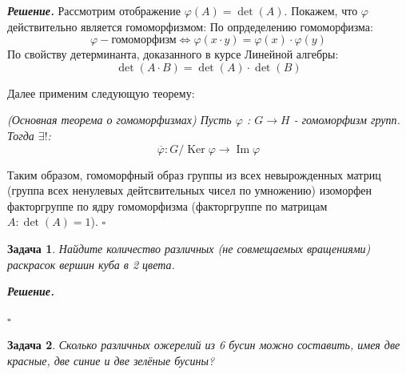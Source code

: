 \documentclass[12pt]{article}
\newtheorem{problem}{Задача}
\newenvironment{solution}[1][\it{Решение}]{\textbf{#1. } }{$\square$}
\DeclareMathOperator{\Ima}{Im}
\DeclareMathOperator{\Kera}{Ker}
\begin{document}
\begin{solution}
    Рассмотрим отображение $\varphi (A) = \det (A)$. Покажем,
    что $\varphi$ действительно является гомоморфизмом:
    По опрдеделению гомоморфизма: 
    $$ 
    \varphi - \text{гомоморфизм} \Leftrightarrow \displaystyle \varphi(x\cdot y)=\varphi(x) \cdot \varphi(y)
    $$
    По свойству детерминанта, доказанного в курсе Линейной алгебры:
    $$
    \det(A \cdot B) = \det (A) \cdot \det(B)
    $$

    Далее применим следующую теорему:
    
    \textit{(Основная теорема о гомоморфизмах) Пусть $\varphi$ : $G \rightarrow H$ - гомоморфизм групп. Тогда $\exists!$:}
    $$
    \overline{\varphi} : G / \Kera \varphi \rightarrow \Ima \varphi
    $$


    Таким образом, гомоморфный образ группы из всех невырожденных матриц (группа всех ненулевых дейтсвительных чисел по умножению) изоморфен факторгруппе по ядру гомоморфизма (факторгруппе по матрицам $A : \det(A) = 1$).
\end{solution}

\begin{problem}
    Найдите количество различных (не совмещаемых вращениями) раскрасок вершин куба в 2 цвета.
\end{problem}

\begin{solution}

\end{solution}

\begin{problem}
    Сколько различных ожерелий из 6 бусин можно составить, имея две красные, две синие и две зелёные бусины?
\end{problem}
\end{document}
